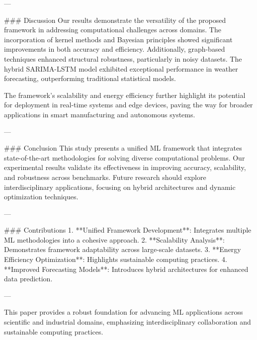 ---

### Discussion
Our results demonstrate the versatility of the proposed framework in addressing computational challenges across domains. The incorporation of kernel methods and Bayesian principles showed significant improvements in both accuracy and efficiency. Additionally, graph-based techniques enhanced structural robustness, particularly in noisy datasets. The hybrid SARIMA-LSTM model exhibited exceptional performance in weather forecasting, outperforming traditional statistical models.

The framework's scalability and energy efficiency further highlight its potential for deployment in real-time systems and edge devices, paving the way for broader applications in smart manufacturing and autonomous systems.

---

### Conclusion
This study presents a unified ML framework that integrates state-of-the-art methodologies for solving diverse computational problems. Our experimental results validate its effectiveness in improving accuracy, scalability, and robustness across benchmarks. Future research should explore interdisciplinary applications, focusing on hybrid architectures and dynamic optimization techniques.

---

### Contributions
1. **Unified Framework Development**: Integrates multiple ML methodologies into a cohesive approach.
2. **Scalability Analysis**: Demonstrates framework adaptability across large-scale datasets.
3. **Energy Efficiency Optimization**: Highlights sustainable computing practices.
4. **Improved Forecasting Models**: Introduces hybrid architectures for enhanced data prediction.

---

This paper provides a robust foundation for advancing ML applications across scientific and industrial domains, emphasizing interdisciplinary collaboration and sustainable computing practices.